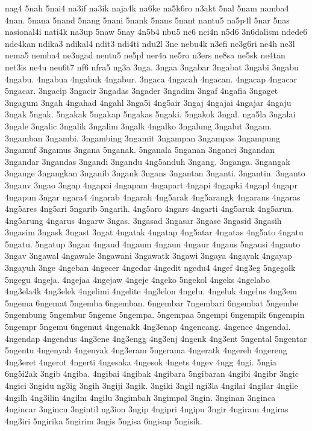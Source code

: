 nag4
5nah
5nai4
na3if
na3ik
naja4k
na6ke
na5k6ro
n3akt
5nal
5nam
namba4
4nan.
5nana
5nand
5nang
5nani
5nank
5nans
5nant
nantu5
na5p4l
5nar
5nas
nasional4i
nati4k
na3up
5naw
5nay
4n5b4
nbu5
nc6
nci4n
n5d6
3n6dalism
ndede6
nde4kan
ndika3
ndikal4
ndit3
ndi4ti
ndu2l
3ne
nebu4k
n3efi
ne3g6ri
ne4h
ne3l
nema5
nemba4
ne3ngad
nentu5
ne5pl
ner4a
ne5ro
n3ers
ne8sa
ne5sk
ne4tan
net3is
ne4u
neu6t7
nf6
nfra5
ng3a
3nga.
3ngaa
3ngabar
3ngabat
3ngabi
3ngabu
4ngabu.
4ngabua
4ngabuk
4ngabur.
3ngaca
4ngacah
4ngacan.
4ngacap
4ngacar
5ngacar.
3ngacip
3ngacir
3ngadas
3ngader
3ngadim
3ngaf
4ngafia
3ngaget
3ngagum
3ngah
4ngahad
4ngahl
3nga5i
4ng5air
3ngaj
4ngajai
4ngajar
4ngaju
3ngak
5ngak.
5ngakak
5ngakap
5ngakas
5ngaki.
5ngakok
3ngal.
nga5la
3ngalai
3ngale
3ngalic
3ngalik
3ngalim
3ngalk
4ngalko
3ngalung
3ngalut
3ngam.
3ngamban
3ngambi.
3ngambing
3ngamit
3ngampan
3ngampas
3ngampung
3ngamuf
3ngamus
3ngana
5nganak.
5nganala
5nganan
3nganci
3ngandan
3ngandar
3ngandas
3ngandi
3ngandu
4ng5anduh
3ngang.
3nganga.
3ngangak
3ngange
3ngangkan
3nganib
3ngank
3ngans
3ngantan
3nganti.
3ngantin.
3nganto
3nganv
3ngao
3ngap
4ngapai
4ngapam
4ngapart
4ngapi
4ngapki
4ngapl
4ngapr
4ngapun
3ngar
ngara4
4ngarab
4ngarah
4ng5arak
4ng5arangk
4ngarans
4ngaras
4ng5ares
4ng5ari
5ngarib
5ngarih.
4ng5aro
4ngars
4ngarti
4ng5aruk
4ng5arun.
4ng5arung
4ngarus
4ngarw
3ngas.
3ngasad
3ngasar
3ngase
3ngasid
3ngasih
3ngasim
3ngask
3ngast
3ngat
4ngatak
4ngatap
4ng5atar
4ngatas
4ng5ato
4ngatu
5ngatu.
5ngatup
3ngau
4ngaud
4ngaum
4ngaun
4ngaur
4ngaus
5ngausi
4ngauto
3ngav
3ngawal
4ngawale
3ngawani
3ngawatk
3ngawi
3ngaya
4ngayak
4ngayap
3ngayuh
3nge
4ngeban
4ngecer
4ngedar
4ngedit
ngedu4
4ngef
4ng3eg
5ngegolk
5ngegu
4ngeja.
4ngejaa
4ngejaw
4ngeje
4ngeko
5ngekol
4ngeks
4ngelabo
4ng3ela4k
4ng3elek
4ngelimi
4ngelite
4ng3elon
4ngelu.
4ngeluk
4ngelus
4ng3em
5ngema
6ngemat
5ngemba
6ngemban.
6ngembar
7ngembari
6ngembat
5ngembe
5ngembung
5ngembur
5ngeme
5ngempa.
5ngempaa
5ngempi
6ngempik
6ngempin
5ngempr
5ngemu
6ngemut
4ngenakk
4ng3enap
4ngencang.
4ngence
4ngendal.
4ngendap
4ngendus
4ng3ene
4ng3engg
4ng3enj
4ngenk
4ng3ent
5ngental
5ngentar
5ngentu
4ngenyah
4ngenyak
4ng3eram
5ngerama
4ngeratk
4ngereh
4ngereng
4ng3eret
4ngerot
4ngerti
4ngesaka
4ngesok
4ngets
4ngev
4ngg
4ngi.
5ngia
6ng5i2ak
3ngib
4ngiba.
4ngibai
4ngibak
4ngibara
5ngibaran
4ngibi
4ngibr
3ngic
4ngici
3ngidu
ng3ig
3ngih
3ngiji
3ngik.
3ngiki
3ngil
ngi3la
4ngilai
4ngilar
4ngile
4ngilh
4ng3ilin
4ngilm
4ngilu
3ngimbah
3ngimpal
3ngin.
3nginan
3nginca
4ngincar
3ngincu
3ngintil
ng3ion
3ngip
4ngipri
4ngipu
3ngir
4ngiram
4ngiras
4ng3iri
5ngirika
5ngirim
3ngis
5ngisa
6ngisap
5ngisik.

